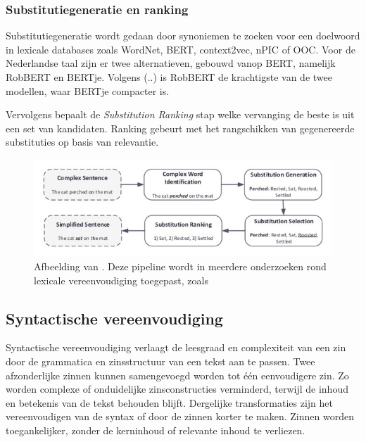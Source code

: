 \subsubsection{Substitutiegeneratie en ranking}

Substitutiegeneratie wordt gedaan door synoniemen te zoeken voor een doelwoord in lexicale databases zoals WordNet, BERT, context2vec, nPIC of OOC. Voor de Nederlandse taal zijn er twee alternatieven, gebouwd vanop BERT, namelijk RobBERT en BERTje. Volgens (..) is RobBERT de krachtigste van de twee modellen, waar BERTje compacter is.

Vervolgens bepaalt de \textit{Substitution Ranking} stap welke vervanging de beste is uit een set van kandidaten. Ranking gebeurt met het rangschikken van gegenereerde substituties op basis van relevantie.

\begin{figure}[H]
	\includegraphics{img/lexical-simplification-pipeline.png}
	\caption{Afbeelding van \textcite{Althunayyan2021}. Deze pipeline wordt in meerdere onderzoeken rond lexicale vereenvoudiging toegepast, zoals \textcite{Paetzold2016, Bingel2018, Bulte2018}}
\end{figure}



\subsection{Syntactische vereenvoudiging}

Syntactische vereenvoudiging verlaagt de leesgraad en complexiteit van een zin door de grammatica en zinsstructuur van een tekst aan te passen. Twee afzonderlijke zinnen kunnen samengevoegd worden tot één eenvoudigere zin. Zo worden complexe of onduidelijke zinsconstructies verminderd, terwijl de inhoud en betekenis van de tekst behouden blijft. Dergelijke transformaties zijn het vereenvoudigen van de syntax of door de zinnen korter te maken. Zinnen worden toegankelijker, zonder de kerninhoud of relevante inhoud te verliezen.

